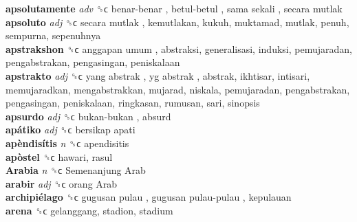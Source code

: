 \textbf{apsolutamente} \emph{adv}  ␝ϲ   benar-benar ,  betul-betul ,  sama sekali ,  secara mutlak   \\
\textbf{apsoluto} \emph{adj}  ␝ϲ   secara mutlak , kemutlakan, kukuh, muktamad, mutlak, penuh, sempurna, sepenuhnya  \\
\textbf{apstrakshon} ␝ϲ   anggapan umum , abstraksi, generalisasi, induksi, pemujaradan, pengabstrakan, pengasingan, peniskalaan  \\
\textbf{apstrakto} \emph{adj}  ␝ϲ   yang abstrak ,  yg abstrak , abstrak, ikhtisar, intisari, memujaradkan, mengabstrakkan, mujarad, niskala, pemujaradan, pengabstrakan, pengasingan, peniskalaan, ringkasan, rumusan, sari, sinopsis  \\
\textbf{apsurdo} \emph{adj}  ␝ϲ   bukan-bukan , absurd  \\
\textbf{apátiko} \emph{adj}  ␝ϲ   bersikap apati   \\
\textbf{apèndisítis} \emph{n}  ␝ϲ  apendisitis  \\
\textbf{apòstel} ␝ϲ  hawari, rasul  \\
\textbf{Arabia} \emph{n}  ␝ϲ   Semenanjung Arab   \\
\textbf{arabir} \emph{adj}  ␝ϲ   orang Arab   \\
\textbf{archipiélago} ␝ϲ   gugusan pulau ,  gugusan pulau-pulau , kepulauan  \\
\textbf{arena} ␝ϲ  gelanggang, stadion, stadium  \\
